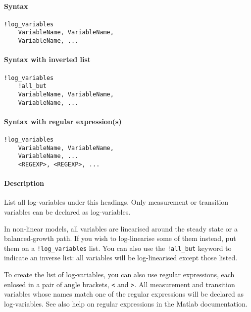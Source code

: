 


	\paragraph{Syntax}

\begin{verbatim}
!log_variables
    VariableName, VariableName, 
    VariableName, ...
\end{verbatim}

\paragraph{Syntax with inverted list}

\begin{verbatim}
!log_variables
    !all_but
    VariableName, VariableName, 
    VariableName, ...
\end{verbatim}

\paragraph{Syntax with regular
expression(s)}

\begin{verbatim}
!log_variables
    VariableName, VariableName, 
    VariableName, ...
    <REGEXP>, <REGEXP>, ...
\end{verbatim}

\paragraph{Description}

List all log-variables under this headings. Only measurement or
transition variables can be declared as log-variables.

In non-linear models, all variables are linearised around the steady
state or a balanced-growth path. If you wish to log-linearise some of
them instead, put them on a \texttt{!log\_variables} list. You can also
use the \texttt{!all\_but} keyword to indicate an inverse list: all
variables will be log-linearised except those listed.

To create the list of log-variables, you can also use regular
expressions, each enlosed in a pair of angle brackets,
\texttt{\textless{}} and \texttt{\textgreater{}}. All measurement and
transition variables whose names match one of the regular expressions
will be declared as log-variables. See also help on regular expressions
in the Matlab documentation.

